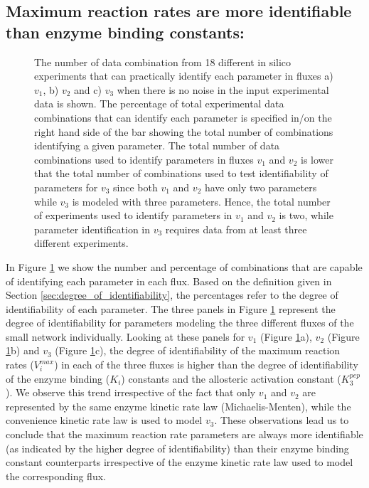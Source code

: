 \documentclass[10pt]{article}
\begin{document}
\subsection{Maximum reaction rates are more identifiable than enzyme binding constants:}\label{sec:trends}
\begin{figure}[!tbhp]
	\caption{The number of data combination from 18 different in silico experiments that can practically identify each parameter in fluxes a) $v_1$, b) $v_2$ and c) $v_3$ when there is no noise in the input experimental data is shown. The percentage of total experimental data combinations that can identify each parameter is specified in/on the right hand side of the bar showing the total number of combinations identifying a given parameter. The total number of data combinations used to identify parameters in fluxes $v_1$ and $v_2$ is lower that the total number of combinations used to test identifiability of parameters for $v_3$ since both $v_1$ and $v_2$ have only two parameters while $v_3$ is modeled with three parameters. Hence, the total number of experiments used to identify parameters in $v_1$ and $v_2$ is two, while parameter identification in $v_3$ requires data from at least three different experiments.}\label{fig:figure1}
\end{figure}
In Figure \ref{fig:figure1} we show the number and percentage of combinations that are capable of identifying each parameter in each flux. Based on the definition given in Section \ref{sec:degree_of_identifiability}, the percentages refer to the degree of identifiability of each parameter. The three panels in Figure \ref{fig:figure1} represent the degree of identifiability for parameters modeling the three different fluxes of the small network individually. Looking at these panels for $v_1$ (Figure \ref{fig:figure1}a), $v_2$ (Figure \ref{fig:figure1}b) and $v_3$ (Figure \ref{fig:figure1}c), the degree of identifiability of the maximum reaction rates ($V_i^{max}$) in each of the three fluxes is higher than the degree of identifiability of the enzyme binding ($K_i$) constants and the allosteric activation constant ($K_3^{pep}$). We observe this trend irrespective of the fact that only  $v_1$ and $v_2$ are represented by the same enzyme kinetic rate law (Michaelis-Menten), while the convenience kinetic rate law is used to model $v_3$. These observations lead us to conclude that the maximum reaction rate parameters are always more identifiable (as indicated by the higher degree of identifiability) than their enzyme binding constant counterparts irrespective of the enzyme kinetic rate law used to model the corresponding flux.
\end{document}

